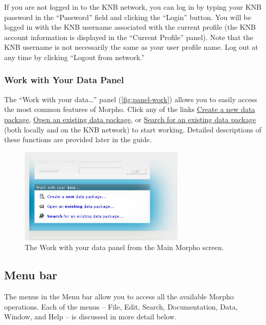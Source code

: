 If you are not logged in to the KNB network, you can log in by typing
your KNB password in the ``Password'' field and clicking the ``Login''
button. You will be logged in with the KNB username associated with the
current profile (the KNB account information is displayed in the
``Current Profile'' panel). Note that the KNB username is not necessarily
the same as your user profile name. Log out at any time by clicking 
``Logout from network.''

\subsubsection[Work with your data\ldots]{Work with Your Data Panel}
\label{sec:panel-work}

The ``Work with your data\ldots'' panel (\autoref{fig:panel-work})
allows you to easily access the most common features of Morpho. Click
any of the links \hyperref[sec:creating]{Create a new data package},
\hyperref[sec:viewing]{Open an existing data package}, or
\hyperref[sec:searching]{Search for an existing data package} (both
locally and on the KNB network) to start working. Detailed descriptions
of these functions are provided later in the guide.

\begin{figure}
  \centering
    \includegraphics[width=0.7\textwidth]{images/panel-work.jpg}
  \caption{The Work with your data panel from the Main Morpho screen.}
  \label{fig:panel-work}
\end{figure}


\subsection{Menu bar} \label{sec:menu-bar}

The menus in the Menu bar allow you to access all the available Morpho
operations. Each of the menus -- File, Edit, Search, Documentation,
Data, Window, and Help -- is discussed in more detail below.


